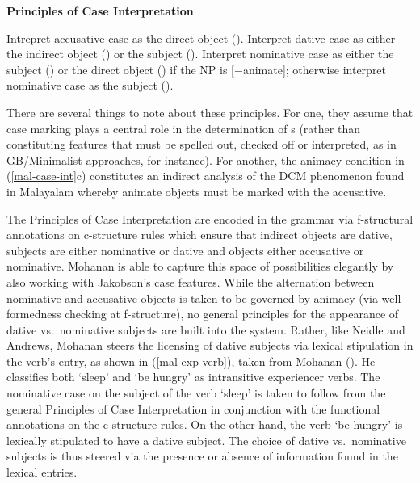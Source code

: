 \documentclass[output=paper,hidelinks]{langscibook}
\begin{document}

\begin{exe}
  \ex \label{mal-case-int}  {\bf Principles of Case Interpretation} \begin{xlist}
    \ex Intrepret accusative case as the direct object (\OBJ).
\ex Interpret dative case as either the indirect object ({})  or the subject
(\SUBJ).
\ex Interpret nominative case as either the subject (\SUBJ) or the direct
object (\OBJ) if the NP is [$-$animate]; otherwise interpret nominative case as
the subject (\SUBJ). 
\end{xlist}
\end{exe}

There are several things to note about these  principles.  For one, they
assume that case marking plays a central role in the determination of {\GF}s
(rather than constituting features that must be spelled out, checked off or
interpreted, as in GB/Minimalist approaches, for instance).  For
another, the animacy condition in (\ref{mal-case-int}c) constitutes an indirect
analysis of the DCM phenomenon found in Malayalam whereby animate objects must
be marked with the accusative.

The Principles of Case Interpretation are encoded in the grammar via
f-struc\-tur\-al annotations on c-structure rules which ensure that indirect objects
are dative, subjects are either nominative or dative and objects either
accusative or nominative.  Mohanan is able to capture this space of possibilities
elegantly by also working with Jakobson's case features. While the alternation
between nominative and accusative objects is taken to be governed by animacy
(via well-formedness checking at f-structure), no general principles for the
appearance of dative vs.~nominative subjects are built into the system.  Rather,
like Neidle and Andrews, Mohanan  steers the licensing of dative subjects
via lexical stipulation in the verb's entry, as shown in (\ref{mal-exp-verb}),
taken from Mohanan (\citeyear[545]{mohanan1982}).  He classifies both `sleep'
and `be hungry' as intransitive experiencer verbs. The nominative case on the
subject of the 
verb `sleep' is taken to follow from the general Principles of Case
Interpretation in conjunction with the functional annotations on the c-structure
rules.  On the other hand, the verb `be hungry' is lexically stipulated to have
a dative subject.  The choice of dative vs.~nominative subjects is thus
steered  via the presence or absence of information found in  the lexical entries.
\end{document}
